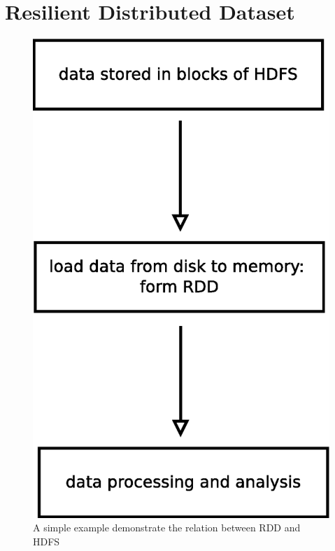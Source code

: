 \documentclass[notheorems, aspectratio=54]{beamer}
\begin{document}

\section{Resilient Distributed Dataset}
\begin{frame}

\begin{figure}
 \includegraphics[scale=0.4]{rdd1}
\caption{A simple example demonstrate the relation between RDD and HDFS}
\end{figure} 

\end{frame}
\end{document}

